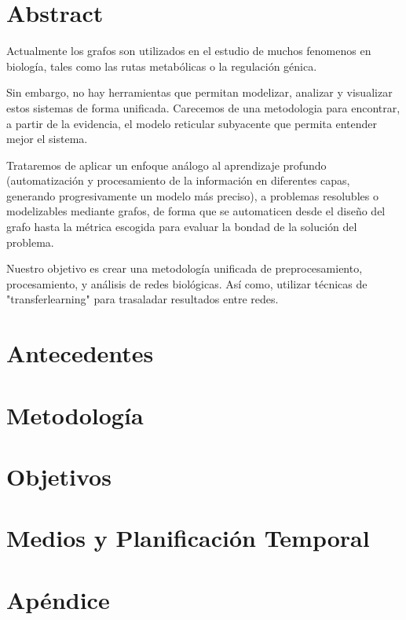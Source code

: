 \documentclass[12pt]{article}
\begin{document}

\tableofcontents          %
\listoffigures \listoftables
\newpage



\section{Abstract}
\bf{Actualmente los grafos son utilizados en el estudio de muchos
fenomenos en biología, tales como las rutas metabólicas o la
regulación génica.

Sin embargo, no hay herramientas que permitan modelizar, analizar y
visualizar estos sistemas de forma unificada. Carecemos de una
metodologia para encontrar, a partir de la evidencia, el modelo
reticular subyacente que permita entender mejor el sistema.

Trataremos de aplicar un enfoque análogo al aprendizaje profundo
(automatización y procesamiento de la información en diferentes capas,
generando progresivamente un modelo más preciso), a problemas
resolubles o modelizables mediante grafos, de forma que se automaticen
desde el diseño del grafo hasta la métrica escogida para evaluar la
bondad de la solución del problema.

Nuestro objetivo es crear una metodología unificada de
preprocesamiento, procesamiento, y análisis de redes biológicas. Así
como, utilizar técnicas de "transferlearning" para trasaladar
resultados entre redes.}

\section{Antecedentes}


\section{Metodología}


\section{Objetivos}


\section{Medios y Planificación Temporal}


 

\appendix
\section{Apéndice}
\end{document}

